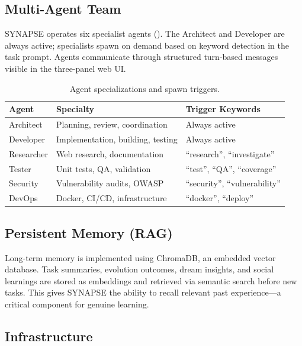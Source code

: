 \documentclass[11pt,a4paper]{article}
\begin{document}
\subsection{Multi-Agent Team}

SYNAPSE operates six specialist agents (). The Architect and Developer are always active; specialists spawn on demand based on keyword detection in the task prompt. Agents communicate through structured turn-based messages visible in the three-panel web UI.

\begin{table}[H]
\centering
\caption{Agent specializations and spawn triggers.}
\label{tab:agents}
\begin{tabular}{@{}lll@{}}
\toprule
\textbf{Agent} & \textbf{Specialty} & \textbf{Trigger Keywords} \\
\midrule
Architect  & Planning, review, coordination & Always active \\
Developer  & Implementation, building, testing & Always active \\
Researcher & Web research, documentation & ``research'', ``investigate'' \\
Tester     & Unit tests, QA, validation & ``test'', ``QA'', ``coverage'' \\
Security   & Vulnerability audits, OWASP & ``security'', ``vulnerability'' \\
DevOps     & Docker, CI/CD, infrastructure & ``docker'', ``deploy'' \\
\bottomrule
\end{tabular}
\end{table}

\subsection{Persistent Memory (RAG)}

Long-term memory is implemented using ChromaDB, an embedded vector database. Task summaries, evolution outcomes, dream insights, and social learnings are stored as embeddings and retrieved via semantic search before new tasks. This gives SYNAPSE the ability to recall relevant past experience---a critical component for genuine learning.

\subsection{Infrastructure}
\end{document}
